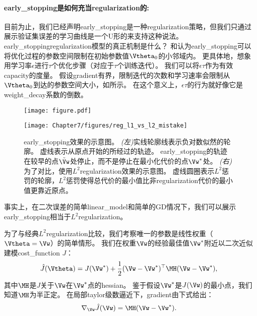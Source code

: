 
\paragraph{\gls{early_stopping}是如何充当\gls{regularization}的:}
目前为止，我们已经声明\gls{early_stopping}是一种\gls{regularization}策略，但我们只通过展示验证集误差的学习曲线是一个U形的来支持这种说法。
\gls{early_stopping}\gls{regularization}模型的真正机制是什么？ 
\cite{Bishop1995}和\cite{Sjoberg95}认为\gls{early_stopping}可以将优化过程的参数空间限制在初始参数值$\Vtheta_0$的小邻域内。
更具体地，想象用学习率$\epsilon$进行$\tau$个优化步骤（对应于$\tau$个训练迭代）。
我们可以将$\epsilon \tau$作为有效\gls{capacity}的度量。
假设\gls{gradient}有界，限制迭代的次数和学习速率会限制从$\Vtheta_0$到达的参数空间大小，如所示。
在这个意义上，$\epsilon \tau$的行为就好像它是\gls{weight_decay}系数的倒数。

\begin{figure}[!htb]
\ifOpenSource
\centerline{\texttt{[image: figure.pdf]}}
\else
\centerline{\texttt{[image: Chapter7/figures/reg\_l1\_vs\_l2\_mistake]}}
\fi
\caption{\gls{early_stopping}效果的示意图。
\emph{(左)}实线轮廓线表示负对数似然的轮廓。
虚线表示从原点开始的所经过的轨迹。 %
\gls{early_stopping}的轨迹在较早的点$\tilde \Vw$处停止，而不是停止在最小化代价的点$\Vw^*$处。
\emph{(右)}为了对比，使用$L^2$\gls{regularization}效果的示意图。
虚线圆圈表示$L^2$惩罚的轮廓，$L^2$惩罚使得总代价的最小值比非\gls{regularization}代价的最小值更靠近原点。
}
\label{fig:chap7_reg_l1_vs_l2_mistake}
\end{figure}

事实上，在二次误差的简单\gls{linear_model}和简单的\gls{GD}情况下，我们可以展示\gls{early_stopping}相当于$L^2$\gls{regularization}。

为了与经典$L^2$\gls{regularization}比较，我们考察唯一的参数是线性权重（$\Vtheta = \Vw$）的简单情形。
我们在权重$\Vw$的经验最佳值$\Vw^*$附近以二次近似建模\gls{cost_function} $J$：
\begin{align}
 \hat J(\Vtheta) = J(\Vw^*) + \frac{1}{2}  (\Vw- \Vw^*)^\top \MH  (\Vw - \Vw^*),
\end{align}
其中$\MH$是$J$关于$\Vw$在$\Vw^*$点的\gls{hessian}。
鉴于假设$\Vw^*$是$J(\Vw)$的最小点，我们知道$\MH$为半正定。
在局部\gls{taylor}级数逼近下，\gls{gradient}由下式给出：
\begin{align}
 \nabla_{\Vw} \hat J (\Vw) = \MH (\Vw - \Vw^*).
\end{align}

